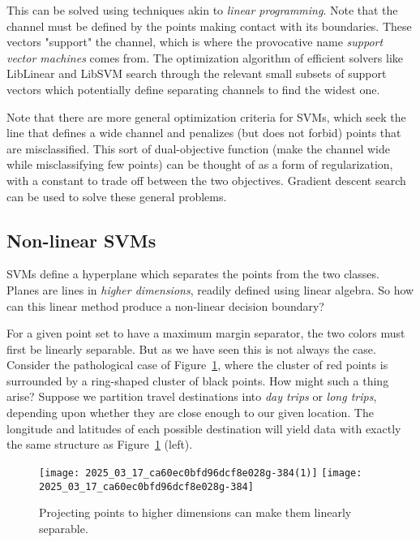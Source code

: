 \documentclass[10pt]{article}
\begin{document}
\begin{enumerate}
This can be solved using techniques akin to \textit{linear programming}. Note that the channel must be defined by the points making contact with its boundaries. These vectors "support" the channel, which is where the provocative name \textit{support vector machines} comes from. The optimization algorithm of efficient solvers like LibLinear and LibSVM search through the relevant small subsets of support vectors which potentially define separating channels to find the widest one.

Note that there are more general optimization criteria for SVMs, which seek the line that defines a wide channel and penalizes (but does not forbid) points that are misclassified. This sort of dual-objective function (make the channel wide while misclassifying few points) can be thought of as a form of regularization, with a constant to trade off between the two objectives. Gradient descent search can be used to solve these general problems.

\subsection{Non-linear SVMs}
SVMs define a hyperplane which separates the points from the two classes. Planes are lines in \textit{higher dimensions}, readily defined using linear algebra. So how can this linear method produce a non-linear decision boundary?

For a given point set to have a maximum margin separator, the two colors must first be linearly separable. But as we have seen this is not always the case. Consider the pathological case of Figure~\ref{fig:projection}, where the cluster of red points is surrounded by a ring-shaped cluster of black points. How might such a thing arise? Suppose we partition travel destinations into \textit{day trips} or \textit{long trips}, depending upon whether they are close enough to our given location. The longitude and latitudes of each possible destination will yield data with exactly the same structure as Figure~\ref{fig:projection} (left).

\begin{figure}[h]
\centering
\texttt{[image: 2025\_03\_17\_ca60ec0bfd96dcf8e028g-384(1)]}
\texttt{[image: 2025\_03\_17\_ca60ec0bfd96dcf8e028g-384]}
\caption{Projecting points to higher dimensions can make them linearly separable.}
\label{fig:projection}
\end{figure}


\end{enumerate}
\end{document}
